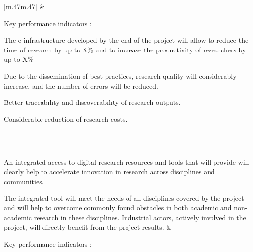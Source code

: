 \begin{supertabular}{|m{.47\textwidth}m{.47\textwidth}|}
 &

  Key performance indicators :
  \begin{compactenum}
\item The e-infrastructure developed by the end of the project will allow to reduce
the time of research by up to X\% and to increase the productivity of researchers by 
up to X\%
\item Due to the dissemination of best practices, research quality will considerably 
increase, and the number of errors will be reduced.
\item Better traceability and discoverability of research outputs.
\item Considerable reduction of research costs.
\end{compactenum}

\\\hline
\hline{}\\\hline

An integrated access to digital research
resources and tools that \TheProject will provide will clearly help to
accelerate innovation in research across disciplines and communities.

The integrated tool will meet the needs of all disciplines covered by
the project and will help to overcome commonly found obstacles in
both academic and non-academic research in these disciplines. Industrial
actors, actively involved in the project, will directly benefit from
the project results. &

Key performance indicators :


\end{supertabular}
